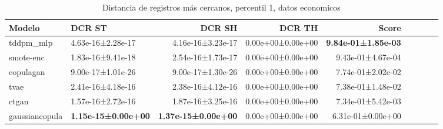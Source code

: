 \begin{table}[H]
\centering
\fontsize{10}{14}\selectfont
\caption{Distancia de registros más cercanos, percentil 1, datos economicos}
\label{table-dcr-economicos-b-1th}
\begin{tabular}{|l|l|r|r|r|r|r|r|r|}
\hline
\rowcolor[gray]{0.8}
Modelo & DCR ST & DCR SH & DCR TH & \textbf{Score} \\
\hline tddpm\_mlp & 4.63e-16±2.28e-17 & 4.16e-16±3.23e-17 & 0.00e+00±0.00e+00 & \bfseries 9.84e-01±1.85e-03 \\
\hline smote-enc & 1.83e-16±9.41e-18 & 2.54e-16±1.73e-17 & 0.00e+00±0.00e+00 & 9.43e-01±4.67e-04 \\
\hline copulagan & \cellcolor[rgb]{0.9, 0.54, 0.52} 9.00e-17±1.01e-26 & \cellcolor[rgb]{0.9, 0.54, 0.52} 9.00e-17±1.30e-26 & 0.00e+00±0.00e+00 & 7.74e-01±2.02e-02 \\
\hline tvae & 2.41e-16±4.18e-16 & 2.38e-16±4.12e-16 & 0.00e+00±0.00e+00 & 7.38e-01±1.48e-02 \\
\hline ctgan & 1.57e-16±2.72e-16 & 1.87e-16±3.25e-16 & 0.00e+00±0.00e+00 & 7.34e-01±5.42e-03 \\
\hline gaussiancopula & \bfseries 1.15e-15±0.00e+00 & \bfseries 1.37e-15±0.00e+00 & 0.00e+00±0.00e+00 & \cellcolor[rgb]{0.9, 0.54, 0.52} 6.31e-01±0.00e+00 \\
\hline
\end{tabular}
\end{table}
